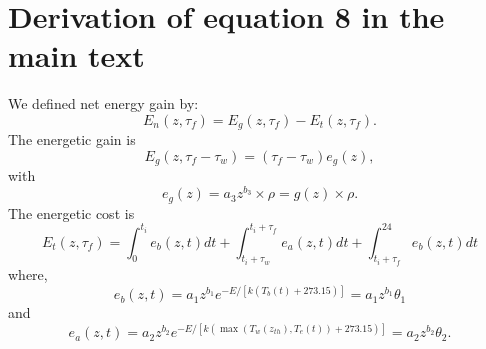 \documentclass[12pt]{article}
\begin{document}
\section{Derivation of  equation 8 in the main text}
We defined net energy gain by: 
\begin{equation} \label{eq:main}
	E_n(z, \tau_f) = E_g(z,\tau_f) - E_t(z, \tau_f).
\end{equation}
The energetic gain is
\[
	E_g(z,\tau_f - \tau_w) = (\tau_f - \tau_w) e_g(z),
\]
with 
\begin{equation} \label{eq:eg}
	e_g(z) = a_3 z^{b_3} \times \rho  = g(z) \times \rho.
\end{equation}
%
The energetic cost is  
\begin{equation} \label{eq:et}
	E_t(z, \tau_f) = \int_0^{t_i} e_b(z, t) dt + \int_{t_i + \tau_w}^{t_i + \tau_f } e_a(z,t) dt + \int_{t_i+\tau_f}^{24} e_b(z, t) dt 
\end{equation}
where,
\begin{equation} \label{eq:eb}
	e_b(z, t) = a_1 z^{b_1} e^{-E/[k (T_b(t)+ 273.15)]} =  a_1 z^{b_1} \theta_1 
\end{equation}
and 
\begin{equation} \label{eq:ea}
	e_a(z,t) = a_2 z^{b_2}  e^{-E/[k (\max(T_w(z_{th}), T_e(t))+ 273.15)]} =  a_2 z^{b_2} \theta_2.
\end{equation}
\end{document}
